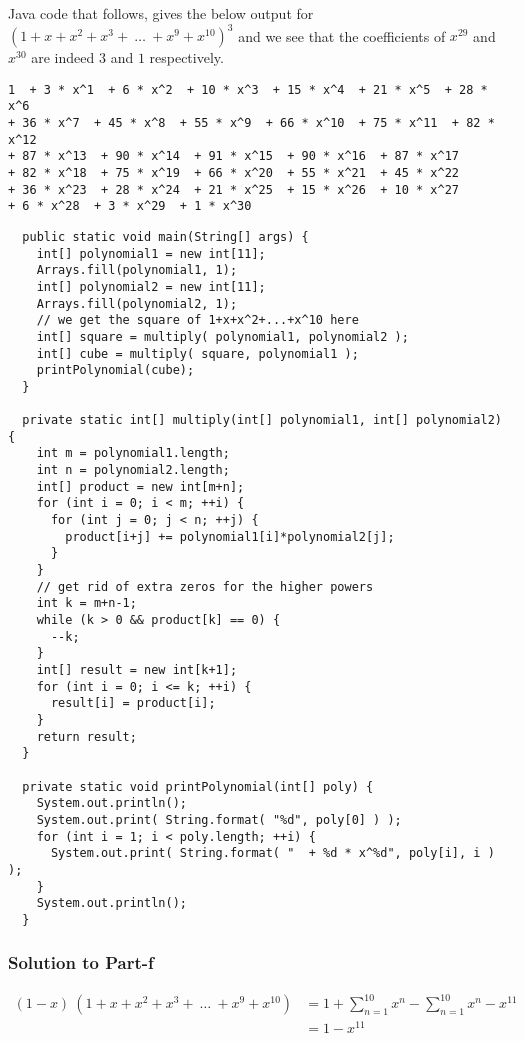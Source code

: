\documentclass[12pt]{article}
\begin{document}
Java code that follows, gives the below output for $\left( 1+x+x^2+x^3+\ \ldots\ +x^9+x^{10} \right)^3$ and we see that the coefficients of $x^{29}$ and $x^{30}$ are indeed $3$ and $1$ respectively. 

\begin{verbatim}
1  + 3 * x^1  + 6 * x^2  + 10 * x^3  + 15 * x^4  + 21 * x^5  + 28 * x^6  
+ 36 * x^7  + 45 * x^8  + 55 * x^9  + 66 * x^10  + 75 * x^11  + 82 * x^12  
+ 87 * x^13  + 90 * x^14  + 91 * x^15  + 90 * x^16  + 87 * x^17  
+ 82 * x^18  + 75 * x^19  + 66 * x^20  + 55 * x^21  + 45 * x^22  
+ 36 * x^23  + 28 * x^24  + 21 * x^25  + 15 * x^26  + 10 * x^27  
+ 6 * x^28  + 3 * x^29  + 1 * x^30
\end{verbatim}
\begin{verbatim}
  public static void main(String[] args) {
    int[] polynomial1 = new int[11];
    Arrays.fill(polynomial1, 1); 
    int[] polynomial2 = new int[11];
    Arrays.fill(polynomial2, 1);
    // we get the square of 1+x+x^2+...+x^10 here
    int[] square = multiply( polynomial1, polynomial2 );
    int[] cube = multiply( square, polynomial1 );
    printPolynomial(cube);
  }
  
  private static int[] multiply(int[] polynomial1, int[] polynomial2) {
    int m = polynomial1.length;
    int n = polynomial2.length;
    int[] product = new int[m+n];
    for (int i = 0; i < m; ++i) {
      for (int j = 0; j < n; ++j) {
        product[i+j] += polynomial1[i]*polynomial2[j];
      }
    }
    // get rid of extra zeros for the higher powers
    int k = m+n-1;
    while (k > 0 && product[k] == 0) {
      --k;
    }    
    int[] result = new int[k+1];
    for (int i = 0; i <= k; ++i) {
      result[i] = product[i];
    }   
    return result;
  }
  
  private static void printPolynomial(int[] poly) {
    System.out.println();
    System.out.print( String.format( "%d", poly[0] ) );
    for (int i = 1; i < poly.length; ++i) {
      System.out.print( String.format( "  + %d * x^%d", poly[i], i ) );
    }
    System.out.println();
  }
\end{verbatim}

\subsubsection*{Solution to Part-f}
\begin{displaymath}
\begin{split}
(1-x)\ \left( 1+x+x^2+x^3+\ \ldots\ +x^9+x^{10} \right) &= 1+\sum_{n=1}^{10}x^n-\sum_{n=1}^{10}x^n-x^{11}\\
														&= 1-x^{11}
\end{split}
\end{displaymath}
\end{document}
